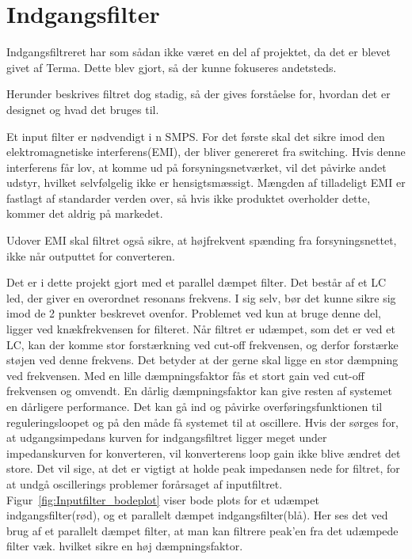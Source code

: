 \section{Indgangsfilter}
Indgangsfiltreret har som sådan ikke været en del af projektet, da det er blevet givet af Terma. Dette blev gjort, så der kunne fokuseres andetsteds. 

\noindent Herunder beskrives filtret dog stadig, så der gives forståelse for, hvordan det er designet og hvad det bruges til.

Et input filter er nødvendigt i n SMPS. For det første skal det sikre imod den elektromagnetiske interferens(EMI), der bliver genereret fra switching. Hvis denne interferens får lov, at komme ud på forsyningsnetværket, vil det påvirke andet udstyr, hvilket selvfølgelig ikke er hensigtsmæssigt. Mængden af tilladeligt EMI er fastlagt af standarder verden over, så hvis ikke produktet overholder dette, kommer det aldrig på markedet\cite{inputfilter}.

Udover EMI skal filtret også sikre, at højfrekvent spænding fra forsyningsnettet, ikke når outputtet for converteren. 

Det er i dette projekt gjort med et parallel dæmpet filter. Det består af et LC led, der giver en overordnet resonans frekvens. I sig selv, bør det kunne sikre sig imod de 2 punkter beskrevet ovenfor. Problemet ved kun at bruge denne del, ligger ved knækfrekvensen for filteret. Når filtret er udæmpet, som det er ved et LC, kan der komme stor forstærkning ved cut-off frekvensen, og derfor forstærke støjen ved denne frekvens. Det betyder at der gerne skal ligge en stor dæmpning ved frekvensen. Med en lille dæmpningsfaktor fås et stort gain ved cut-off frekvensen og omvendt. En dårlig dæmpningsfaktor kan give resten af systemet en dårligere performance. Det kan gå ind og påvirke overføringsfunktionen til reguleringsloopet og på den måde få systemet til at oscillere. Hvis der sørges for, at udgangsimpedans kurven for indgangsfiltret ligger meget under impedanskurven for konverteren, vil konverterens loop gain ikke blive ændret det store. Det vil sige, at det er vigtigt at holde peak impedansen nede for filtret, for at undgå oscillerings problemer forårsaget af inputfiltret. Figur~\ref{fig:Inputfilter_bodeplot} viser bode plots for et udæmpet indgangsfilter(rød), og et parallelt dæmpet indgangsfilter(blå). Her ses det ved brug af et parallelt dæmpet filter, at man kan filtrere peak'en fra det udæmpede filter væk. hvilket sikre en høj dæmpningsfaktor. 

